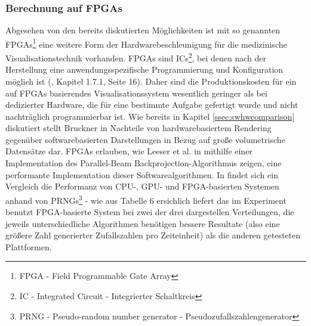 \documentclass[a4paper,titlepage,12pt]{scrartcl}
\newtheorem[L]{boxedDefinition}{Definition}
\begin{document}
\subsubsection{Berechnung auf FPGAs}
Abgesehen von den bereits diskutierten Möglichkeiten ist mit so genannten FPGAs\footnote{FPGA - Field Programmable Gate Array} eine weitere Form der Hardwarebeschleunigung für die medizinische Visualisationstechnik vorhanden. FPGAs sind ICs\footnote{IC - Integrated Circuit - Integrierter Schaltkreis}, bei denen nach der Herstellung eine anwendungsspezifische Programmierung und Konfiguration möglich ist (\cite{Kibritev2009}, Kapitel 1.7.1, Seite 16). Daher sind die Produktionskosten für ein auf FPGAs basierendes Visualisationssystem wesentlich geringer als bei dedizierter Hardware, die für eine bestimmte Aufgabe gefertigt wurde und nicht nachträglich programmierbar ist. Wie bereits in Kapitel \vref{ssec:swhwcomparison} diskutiert stellt Bruckner in \cite{Bruckner2004} Nachteile von hardwarebasiertem Rendering gegenüber softwarebasierten Darstellungen in Bezug auf große volumetrische Datensätze dar. FPGAs erlauben, wie Leeser et al. in \cite{Leeser2005} mithilfe einer Implementation des Parallel-Beam Backprojection-Algorithmus zeigen, eine performante Implementation dieser Softwarealgorithmen. In \cite{Thomas2009} findet sich ein Vergleich die Performanz von CPU-, GPU- und FPGA-basierten Systemen anhand von PRNGs\footnote{PRNG - Pseudo-random number generator - Pseudozufallszahlengenerator} - wie aus Tabelle 6 ersichlich liefert das im Experiment benutzt FPGA-basierte System bei zwei der drei dargestellen Verteilungen, die jeweils unterschiedliche Algorithmen benötigen bessere Resultate (also eine größere Zahl generierter Zufallszahlen pro Zeiteinheit) als die anderen getesteten Plattformen.
\end{document}
